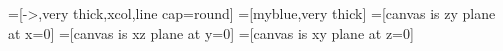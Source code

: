 
\usepackage{graphicx} %
\usepackage{tikz}
\usepackage{physics}
\usepackage[outline]{contour} %
\usepackage{xcolor}


\usetikzlibrary{angles,quotes} %
\usetikzlibrary{bending} %
\contourlength{1.0pt}
\usetikzlibrary{3d}

\tikzset{>=latex} %

=[->,very thick,xcol,line cap=round]
=[myblue,very thick]
=[canvas is zy plane at x=0]
=[canvas is xz plane at y=0]
=[canvas is xy plane at z=0]
\def\tick#1#2{\draw[thick] (#1) ++ (#2:0.12) --++ (#2-180:0.24)}
\def\N{100}



\def\xang{-13}
\def\zang{45}

